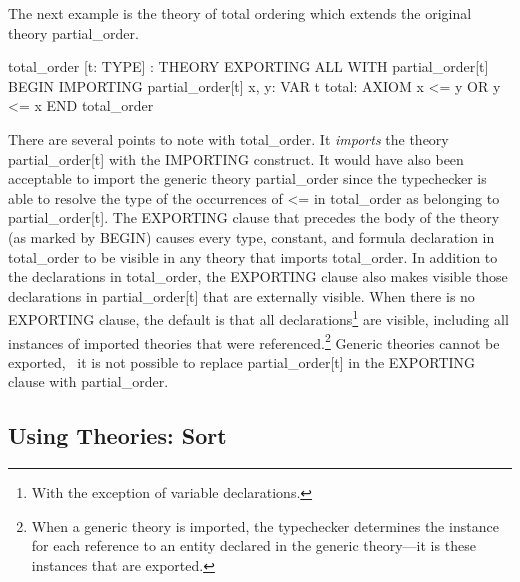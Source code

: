 The next example is the theory of total ordering which extends the
original theory {\stt partial\_order}.
\begin{pvsex}
  total\_order [t: TYPE] : THEORY
   EXPORTING ALL WITH partial\_order[t]
   BEGIN
    IMPORTING partial\_order[t]
    x, y: VAR t
    total: AXIOM  x <= y OR y <= x
   END total\_order
\end{pvsex}
%
There are several points to note with {\stt total\_order}.  It {\em
imports\/} the theory {\stt partial\_order[t]} with the {\stt
IMPORTING} construct.  It would have also been acceptable to import
the generic theory {\stt partial\_order} since the typechecker is able
to resolve the type of the occurrences of {\stt <=} in {\stt
total\_order} as belonging to {\stt partial\_order[t]}.  The {\stt
EXPORTING} clause that precedes the body of the theory (as marked by
{\stt BEGIN}) causes every type, constant, and formula declaration in
{\stt total\_order} to be visible in any theory that imports {\stt
total\_order}.  In addition to the declarations in {\stt
total\_order}, the {\stt EXPORTING} clause also makes visible those
declarations in {\stt partial\_order[t]} that are externally visible.
When there is no {\stt EXPORTING} clause, the default is that all
declarations\footnote{With the exception of variable declarations.}
are visible, including all instances of imported theories that were
referenced.\footnote{When a generic theory is imported, the
typechecker determines the instance for each reference to an
entity declared in the generic theory---it is these instances that are
exported.} Generic theories cannot be exported, \ie\ it is not
possible to replace {\stt partial\_order[t]} in the {\stt EXPORTING}
clause with {\stt partial\_order}.


\subsection{Using Theories: Sort}


